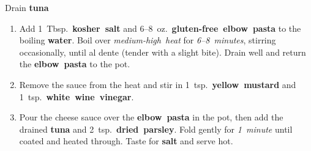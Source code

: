 \documentclass[11pt,letterpaper]{article}
\begin{document}
\noindent
Drain \textbf{tuna}

\begin{enumerate}
    \item Add 1~Tbsp.~\textbf{kosher~salt} and 6--8~oz.~\textbf{gluten-free~elbow~pasta} to the boiling \textbf{water}. Boil over \textit{medium-high~heat} for \textit{6--8~minutes}, stirring occasionally, until al dente (tender with a slight bite). Drain well and return the \textbf{elbow~pasta} to the pot.

    \item Remove the sauce from the heat and stir in 1~tsp.~\textbf{yellow~mustard} and 1~tsp.~\textbf{white~wine~vinegar}.

    \item Pour the cheese sauce over the \textbf{elbow~pasta} in the pot, then add the drained \textbf{tuna} and 2~tsp.~\textbf{dried~parsley}. Fold gently for \textit{1~minute} until coated and heated through. Taste for \textbf{salt} and serve hot.
\end{enumerate}

\newpage
\end{document}
